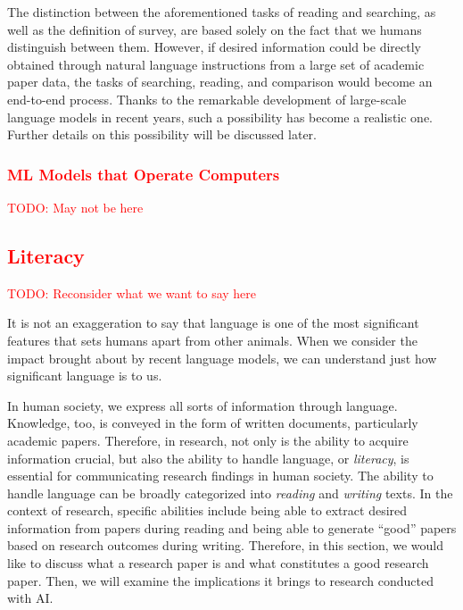 \documentclass{book}
\begin{document}
The distinction between the aforementioned tasks of reading and searching, as well as the definition of survey, are based solely on the fact that we humans distinguish between them. However, if desired information could be directly obtained through natural language instructions from a large set of academic paper data, the tasks of searching, reading, and comparison would become an end-to-end process. Thanks to the remarkable development of large-scale language models in recent years, such a possibility has become a realistic one. Further details on this possibility will be discussed later.

\subsubsection{\textcolor{red}{ML Models that Operate Computers}}
\textcolor{red}{TODO: May not be here}

\subsection{\textcolor{red}{Literacy}}
\textcolor{red}{TODO: Reconsider what we want to say here}

It is not an exaggeration to say that language is one of the most significant features that sets humans apart from other animals. When we consider the impact brought about by recent language models, we can understand just how significant language is to us.

In human society, we express all sorts of information through language. Knowledge, too, is conveyed in the form of written documents, particularly academic papers. Therefore, in research, not only is the ability to acquire information crucial, but also the ability to handle language, or \textit{literacy}, is essential for communicating research findings in human society. The ability to handle language can be broadly categorized into \textit{reading} and \textit{writing} texts. In the context of research, specific abilities include being able to extract desired information from papers during reading and being able to generate ``good'' papers based on research outcomes during writing. Therefore, in this section, we would like to discuss what a research paper is and what constitutes a good research paper. Then, we will examine the implications it brings to research conducted with AI.

\end{document}
